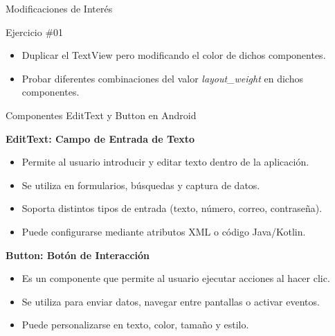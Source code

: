 \begin{frame}{Modificaciones de Interés}

\begin{block}{Ejercicio \#01}
\begin{itemize}
\item Duplicar el TextView pero modificando el color de dichos componentes. 
\item Probar diferentes combinaciones del valor \textit{layout\_weight} en dichos componentes. 

\end{itemize}
\end{block}


\end{frame}

\begin{frame}{Componentes EditText y Button en Android}

\textbf{EditText: Campo de Entrada de Texto}
\begin{itemize}
    \item Permite al usuario introducir y editar texto dentro de la aplicación.
    \item Se utiliza en formularios, búsquedas y captura de datos.
    \item Soporta distintos tipos de entrada (texto, número, correo, contraseña).
    \item Puede configurarse mediante atributos XML o código Java/Kotlin.
\end{itemize}

\vspace{0.4cm}

\textbf{Button: Botón de Interacción}
\begin{itemize}
    \item Es un componente que permite al usuario ejecutar acciones al hacer clic.
    \item Se utiliza para enviar datos, navegar entre pantallas o activar eventos.
    \item Puede personalizarse en texto, color, tamaño y estilo.
\end{itemize}


\end{frame}



